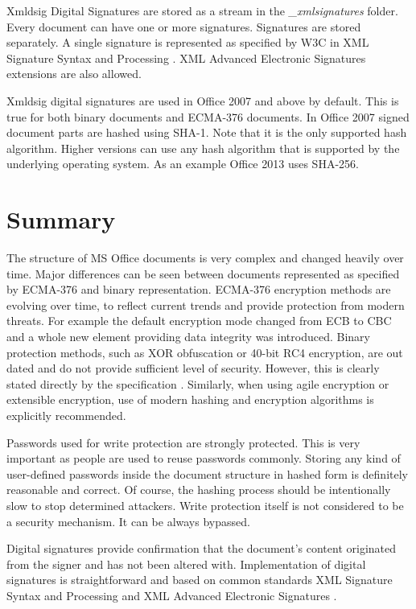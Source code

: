 \documentclass[11pt,oneside]{fithesis2}
\begin{document}
Xmldsig Digital Signatures are stored as a stream in the \textit{\_xmlsignatures} folder. Every document can have one or more signatures. Signatures are stored separately. A single signature is represented as specified by W3C in XML Signature Syntax and Processing \cite{xmlsig}. XML Advanced Electronic Signatures \cite{xades} extensions are also allowed.

Xmldsig digital signatures are used in Office 2007 and above by default. This is true for both binary documents and ECMA-376 documents. In Office 2007 signed document parts are hashed using SHA-1. Note that it is the only supported hash algorithm. Higher versions can use any hash algorithm that is supported by the underlying operating system. As an example Office 2013 uses SHA-256.

\section{Summary}

The structure of MS Office documents is very complex and changed heavily over time. Major differences can be seen between documents represented as specified by ECMA-376 and binary representation. ECMA-376 encryption methods are evolving over time, to reflect current trends and provide protection from modern threats. For example the default encryption mode changed from ECB to CBC and a whole new element providing data integrity was introduced. Binary protection methods, such as XOR obfuscation or 40-bit RC4 encryption, are out dated and do not provide sufficient level of security. However, this is clearly stated directly by the specification \cite[p. 93]{msoffcrypto}. Similarly, when using agile encryption or extensible encryption, use of modern hashing and encryption algorithms is explicitly recommended.

Passwords used for write protection are strongly protected. This is very important as people are used to reuse passwords commonly. Storing any kind of user-defined passwords inside the document structure in hashed form is definitely reasonable and correct. Of course, the hashing process should be intentionally slow to stop determined attackers. Write protection itself is not considered to be a security mechanism. It can be always bypassed. 

Digital signatures provide confirmation that the document's content originated from the signer and has not been altered with. Implementation of digital signatures is straightforward and based on common standards XML Signature Syntax and Processing \cite{xmlsig} and XML Advanced Electronic Signatures \cite{xades}. 
\end{document}
